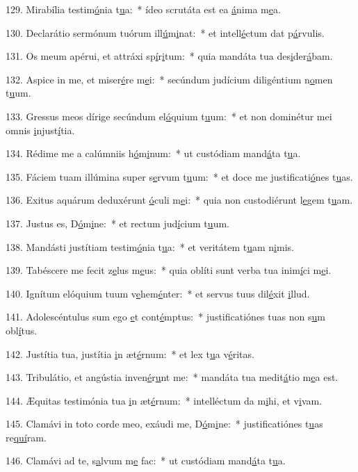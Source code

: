 129. Mirabília testim\uline{ó}nia t\uline{u}a:~* ídeo scrutáta est ea \uline{á}nima m\uline{e}a.\par 
130. Declarátio sermónum tuórum ill\uline{ú}m\uline{i}nat:~* et intell\uline{é}ctum dat p\uline{á}rvulis.\par 
131. Os meum apérui, et attráxi sp\uline{í}r\uline{i}tum:~* quia mandáta tua des\uline{i}der\uline{á}bam.\par 
132. Aspice in me, et miser\uline{é}re m\uline{e}i:~* secúndum judícium diligéntium n\uline{o}men t\uline{u}um.\par 
133. Gressus meos dírige secúndum el\uline{ó}quium t\uline{u}um:~* et non dominétur mei omnis \uline{i}njust\uline{í}tia.\par 
134. Rédime me a calúmniis h\uline{ó}m\uline{i}num:~* ut custódiam mand\uline{á}ta t\uline{u}a.\par 
135. Fáciem tuam illúmina super s\uline{e}rvum t\uline{u}um:~* et doce me justificati\uline{ó}nes t\uline{u}as.\par 
136. Exitus aquárum deduxérunt \uline{ó}culi m\uline{e}i:~* quia non custodiérunt l\uline{e}gem t\uline{u}am.\par 
137. Justus es, D\uline{ó}m\uline{i}ne:~* et rectum jud\uline{í}cium t\uline{u}um.\par 
138. Mandásti justítiam testim\uline{ó}nia t\uline{u}a:~* et veritátem t\uline{u}am n\uline{i}mis.\par 
139. Tabéscere me fecit z\uline{e}lus m\uline{e}us:~* quia oblíti sunt verba tua inim\uline{í}ci m\uline{e}i.\par 
140. Ignítum elóquium tuum v\uline{e}hem\uline{é}nter:~* et servus tuus dil\uline{é}xit \uline{i}llud.\par 
141. Adolescéntulus sum ego \uline{e}t cont\uline{é}mptus:~* justificatiónes tuas non s\uline{u}m obl\uline{í}tus.\par 
142. Justítia tua, justítia \uline{i}n æt\uline{é}rnum:~* et lex t\uline{u}a v\uline{é}ritas.\par 
143. Tribulátio, et angústia inven\uline{é}r\uline{u}nt me:~* mandáta tua medit\uline{á}tio m\uline{e}a est.\par 
144. Æquitas testimónia tua \uline{i}n æt\uline{é}rnum:~* intelléctum da m\uline{i}hi, et v\uline{i}vam.\par 
145. Clamávi in toto corde meo, exáudi me, D\uline{ó}m\uline{i}ne:~* justificatiónes t\uline{u}as re\uline{quí}ram.\par 
146. Clamávi ad te, s\uline{a}lvum m\uline{e} fac:~* ut custódiam mand\uline{á}ta t\uline{u}a.\par 
